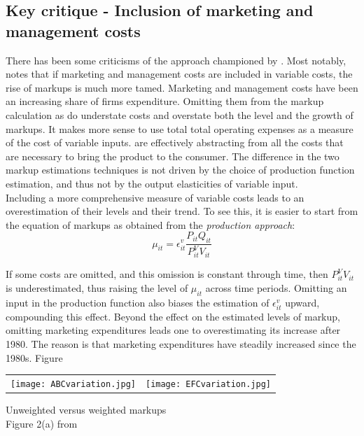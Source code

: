 \documentclass{amsart}
\theoremstyle{definition}
\theoremstyle{remark}
\numberwithin{equation}{section}
\begin{document}
\subsection*{Key critique - Inclusion of marketing and management costs} There has been some criticisms of the approach championed by \cite{de2019rise}. Most notably, \cite{traina2018aggregate} notes that if marketing and management costs are included in variable costs, the rise of markups is much more tamed. Marketing and management costs have been an increasing share of firms expenditure. Omitting them from the markup calculation as \cite{de2019rise} do understate costs and overstate both the level and the growth of markups. It makes more sense to use total total operating expenses as a measure of the cost of variable inputs. \cite{de2019rise} are effectively abstracting from all the costs that are necessary to bring the product to the consumer. The difference in the two markup estimations techniques is not driven by the choice of production function estimation, and thus not by the output elasticities of variable input. \\

Including a more comprehensive measure of variable costs leads to an overestimation of their levels and their trend. To see this, it is easier to start from the equation of markups as obtained from the \textit{production approach}:
$$\mu_{i t}=\epsilon_{i t}^v \frac{P_{i t} Q_{i t}}{P_{i t}^{V} V_{i t}}$$

If some costs are omitted, and this omission is constant through time, then $P_{i t}^{V} V_{i t}$ is underestimated, thus raising the level of $\mu_{i t}$ across time periods. Omitting an input in the production function also biases the estimation of $\epsilon_{i t}^v$ upward, compounding this effect. Beyond the effect on the estimated levels of markup, omitting marketing expenditures leads one to overestimating  its increase after 1980. The reason is that marketing expenditures have steadily increased since the 1980s. Figure 


\begin{center}
    \begin{tabular}{m{8.5cm}m{8.5cm}}
        \texttt{[image: ABCvariation.jpg]} & \texttt{[image: EFCvariation.jpg]} \\ 
    \end{tabular}
    \centering
    \caption{Unweighted versus weighted markups \\ Figure 2(a) from \cite{deloecker2017rise}}
    \label{fig:unweighted}
\end{center}
\end{document}
